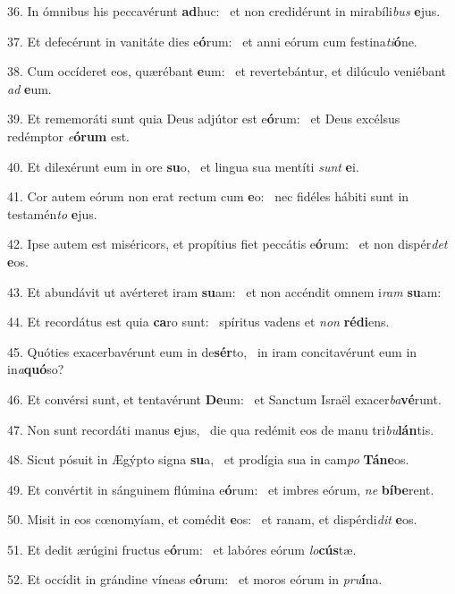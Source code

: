 36. In ómnibus his peccavérunt \textbf{ad}huc: \ast\  et non credidérunt in mirabíli\textit{bus} \textbf{e}jus.\

37. Et defecérunt in vanitáte dies e\textbf{ó}rum: \ast\  et anni eórum cum festina\textit{ti}\textbf{ó}ne.\

38. Cum occíderet eos, quærébant \textbf{e}um: \ast\  et revertebántur, et dilúculo veniébant \textit{ad} \textbf{e}um.\

39. Et rememoráti sunt quia Deus adjútor est e\textbf{ó}rum: \ast\  et Deus excélsus redémptor \textit{e}\textbf{ó}\textbf{rum} est.\

40. Et dilexérunt eum in ore \textbf{su}o, \ast\  et lingua sua mentíti \textit{sunt} \textbf{e}i.\

41. Cor autem eórum non erat rectum cum \textbf{e}o: \ast\  nec fidéles hábiti sunt in testamén\textit{to} \textbf{e}jus.\

42. Ipse autem est miséricors, et propítius fiet peccátis e\textbf{ó}rum: \ast\  et non dispér\textit{det} \textbf{e}os.\

43. Et abundávit ut avérteret iram \textbf{su}am: \ast\  et non accéndit omnem i\textit{ram} \textbf{su}am:\

44. Et recordátus est quia \textbf{ca}ro sunt: \ast\  spíritus vadens et \textit{non} \textbf{réd}\textbf{i}ens.\

45. Quóties exacerbavérunt eum in de\textbf{sér}to, \ast\  in iram concitavérunt eum in in\textit{a}\textbf{quó}so?\

46. Et convérsi sunt, et tentavérunt \textbf{De}um: \ast\  et Sanctum Israël exacer\textit{ba}\textbf{vé}runt.\

47. Non sunt recordáti manus \textbf{e}jus, \ast\  die qua redémit eos de manu tri\textit{bu}\textbf{lán}tis.\

48. Sicut pósuit in Ægýpto signa \textbf{su}a, \ast\  et prodígia sua in cam\textit{po} \textbf{Tá}\textbf{ne}os.\

49. Et convértit in sánguinem flúmina e\textbf{ó}rum: \ast\  et imbres eórum, \textit{ne} \textbf{bí}\textbf{be}rent.\

50. Misit in eos cœnomyíam, et comédit \textbf{e}os: \ast\  et ranam, et dispérdi\textit{dit} \textbf{e}os.\

51. Et dedit ærúgini fructus e\textbf{ó}rum: \ast\  et labóres eórum \textit{lo}\textbf{cús}tæ.\

52. Et occídit in grándine víneas e\textbf{ó}rum: \ast\  et moros eórum in \textit{pru}\textbf{í}na.\

